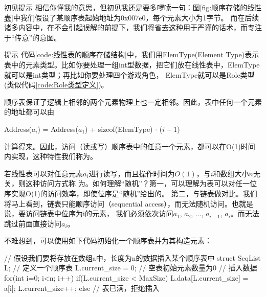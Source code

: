 \begin{notebox}{初见提示}
相信你懂我的意思，但初见我还是要多啰嗦一句：图\ref{fig:顺序存储的线性表}中我们假设了某顺序表起始地址为0x007e0，每个元素大小为1字节。
而在后续诸多内容中，在不会引起误解的前提下，我们将省去这种用于严谨的话术，而专注于“传意”的意图。
\end{notebox}

\begin{notebox}{提示}
代码\ref{code:线性表的顺序存储结构}中，我们用ElemType(Element Type)表示表中的元素类型。比如你要处理一组int型数据，把它们放在线性表中，ElemType就可以是int类型；再比如你要处理四个游戏角色，
ElemType就可以是Role类型(类似代码\ref{code:Role类型定义})。
\end{notebox}
顺序表保证了逻辑上相邻的两个元素物理上也一定相邻。因此，表中任何一个元素的地址都可以由
\begin{bulk}
    \begin{center}
        Address(\(a_i\)) = Address(\(a_1\)) + sizeof(ElemType) \(\cdot\) (\(i-1\)) 
    \end{center}
\end{bulk} 
计算得来。因此，访问（读或写）顺序表中的任意一个元素，都可以在O(1)时间内实现，这种特性我们称为。
\begin{insightbox}
若线性表可以对任意元素\(a_i\)进行读写，而且操作时间为\(O(1)\)，与\(i\)和数组大小\(n\)无关，则这种访问方式称
为。如何理解“随机”？第一，可以理解为表可以对任一位序实现O(1)的访问效率，即使位序是“随机”给出的。
第二，与链表做对比。我们将马上看到，链表只能顺序访问（sequential access），而无法随机访问。也就是说，要访问链表中位序为i的元素，
我们必须依次访问\(a_1\), \(a_2\), ..., \(a_{i-1}\), \(a_i\)。而无法跳过前面直接访问\(a_i\)。
\end{insightbox}
不难想到，可以使用如下代码初始化一个顺序表并为其构造元素：
\begin{cppcode}
    // 假设我们要将存放在数组a中，长度为n的数据插入某个顺序表中 
    struct SeqList L;        // 定义一个顺序表
    L.current_size = 0;     // 空表初始元素数量为0
    // 插入数据
    for(int i=0; i<n; i++) {
        if(L.current_size < MaxSize) {    
            L.data[L.current_size] = a[i];  
            L.current_size++;
        } else {
            // 表已满，拒绝插入
        }
    }
\end{cppcode}

